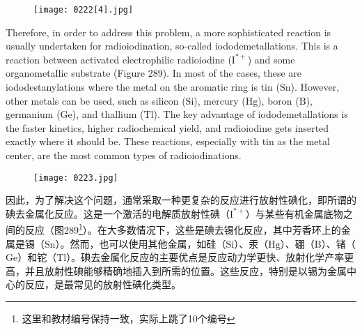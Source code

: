 \documentclass[dvipsnames, svgnames,a4paper,11pt]{article}
\begin{document}
\begin{figure}[h]
	\centering
    \texttt{[image: 0222[4].jpg]}  
     \label{fig278}
\end{figure}


Therefore, in order to address this problem, a more sophisticated reaction is usually undertaken for radioiodination, so-called iododemetallations. This is a reaction between activated electrophilic radioiodine (\(\mathrm{I^{*+}}\)) and some organometallic substrate (Figure 289). In most of the cases, these are iododestanylations where the metal on the aromatic ring is tin (\(\mathrm{Sn}\)). However, other metals can be used, such as silicon (\(\mathrm{Si}\)), mercury (\(\mathrm{Hg}\)), boron (\(\mathrm{B}\)), germanium (\(\mathrm{Ge}\)), and thallium (\(\mathrm{Tl}\)). The key advantage of iododemetallations is the faster kinetics, higher radiochemical yield, and radioiodine gets inserted exactly where it should be. These reactions, especially with tin as the metal center, are the most common types of radioiodinations.

\setcounter{figure}{288}


\begin{figure}[h]
	\centering
    \texttt{[image: 0223.jpg]}  
     \label{fig289}
\end{figure}


因此，为了解决这个问题，通常采取一种更复杂的反应进行放射性碘化，即所谓的碘去金属化反应。这是一个激活的电解质放射性碘（\(\mathrm{I^{*+}}\)）与某些有机金属底物之间的反应（图289\footnote{这里和教材编号保持一致，实际上跳了10个编号}）。在大多数情况下，这些是碘去锡化反应，其中芳香环上的金属是锡（\(\mathrm{Sn}\)）。然而，也可以使用其他金属，如硅（\(\mathrm{Si}\)）、汞（\(\mathrm{Hg}\)）、硼（\(\mathrm{B}\)）、锗（\(\mathrm{Ge}\)）和铊（\(\mathrm{Tl}\)）。碘去金属化反应的主要优点是反应动力学更快、放射化学产率更高，并且放射性碘能够精确地插入到所需的位置。这些反应，特别是以锡为金属中心的反应，是最常见的放射性碘化类型。
\end{document}
